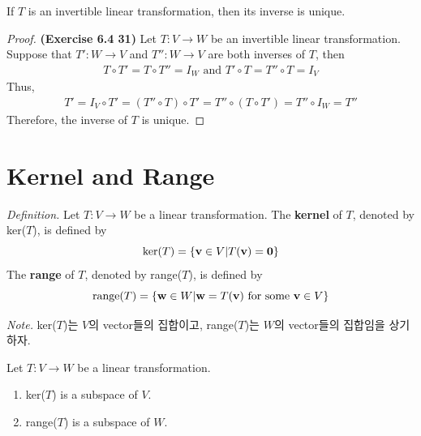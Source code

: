 \begin{theorem}
	If $T$ is an invertible linear transformation, then its inverse is unique.
\end{theorem}

\begin{proof}
	\textbf{(Exercise 6.4 31)} Let $T: V \rightarrow W$ be an invertible linear transformation. Suppose that $T': W \rightarrow V$ and $T'': W \rightarrow V$ are both inverses of $T$, then \begin{align*}
		T \circ T' = T \circ T'' = I_W \mbox{ and } T' \circ T = T'' \circ T = I_V
	\end{align*} Thus, \begin{align*}
		T' = I_V \circ T' = (T'' \circ T) \circ T' = T'' \circ (T \circ T') = T'' \circ I_W = T''
	\end{align*} Therefore, the inverse of $T$ is unique.
\end{proof}

\section{Kernel and Range}
\textit{Definition.} Let $T: V \rightarrow W$ be a linear transformation. The \textbf{kernel} of $T$, denoted by ker($T$), is defined by \begin{equation*}
	\textnormal{ker}(T) = \{ \textbf{v} \in V \vert T(\textbf{v}) = \textbf{0} \}
\end{equation*}
The \textbf{range} of $T$, denoted by range($T$), is defined by \begin{equation*}
	\textnormal{range}(T) = \{\textbf{w} \in W \vert \textbf{w} = T(\textbf{v}) \mbox{ for some } \textbf{v} \in V \}
\end{equation*}

\textit{Note.} ker($T$)는 $V$의 vector들의 집합이고, range($T$)는 $W$의 vector들의 집합임을 상기하자.

\begin{theorem}
	Let $T: V \rightarrow W$ be a linear transformation. \begin{enumerate}
		\item ker($T$) is a subspace of $V$.
		\item range($T$) is a subspace of $W$.
	\end{enumerate}
\end{theorem}

